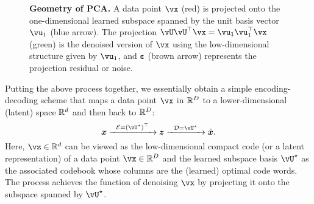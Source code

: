 \documentclass[../../book-main.tex]{subfiles}
\begin{document}
\begin{figure}
    \centering
    \caption{\small \textbf{Geometry of PCA.} A data point $\vx$ (red) is projected onto the one-dimensional learned subspace spanned by the unit basis vector $\vu_1$ (blue arrow). The projection $\vU\vU^\top\vx = \vu_{1}\vu_{1}^{\top}\vx$ (green) is the denoised version of $\vx$ using the low-dimensional structure given by $\vu_{1}$, and $\boldsymbol{\varepsilon}$ (brown arrow) represents the projection residual or noise.}
    \label{fig:pca-geometry}
\end{figure}

Putting the above process together, we essentially obtain a simple encoding-decoding scheme that maps a data point $\vx$ in $\mathbb{R}^D$ to a lower-dimensional (latent) space $\mathbb{R}^d$ and then back to $\mathbb{R}^D$:
\begin{equation}
\x \xrightarrow{\hspace{2mm} \mathcal{E} = (\vU^\star)^\top \hspace{2mm}}  \z
    \xrightarrow{\hspace{2mm} \mathcal{D} = \vU^\star \hspace{2mm}}   \hat{\x}.  
\label{eqn:autoencoding-PCA}
\end{equation}
Here, $\vz \in \R^d$ can be viewed as the low-dimensional compact code (or
a latent representation) of a data point  $\vx \in \R^D$ and the learned subspace
basis $\vU^\star$ as the associated codebook whose columns are the (learned)
optimal code words. The process achieves the function of denoising $\vx$ by
projecting it onto the subspace spanned by $\vU^\star$.
\end{document}
